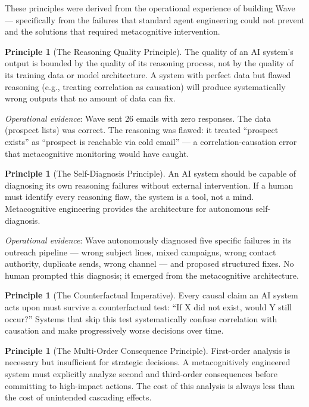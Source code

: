 \documentclass[12pt,a4paper]{article}
\theoremstyle{plain}
\theoremstyle{definition}
\newtheorem{principle}[theorem]{Principle}
\theoremstyle{remark}
\begin{document}
These principles were derived from the operational experience of building Wave --- specifically from the failures that standard agent engineering could not prevent and the solutions that required metacognitive intervention.

\begin{principle}[The Reasoning Quality Principle]
The quality of an AI system's output is bounded by the quality of its reasoning process, not by the quality of its training data or model architecture. A system with perfect data but flawed reasoning (e.g., treating correlation as causation) will produce systematically wrong outputs that no amount of data can fix.
\end{principle}

\textit{Operational evidence}: Wave sent 26 emails with zero responses. The data (prospect lists) was correct. The reasoning was flawed: it treated ``prospect exists'' as ``prospect is reachable via cold email'' --- a correlation-causation error that metacognitive monitoring would have caught.

\begin{principle}[The Self-Diagnosis Principle]
An AI system should be capable of diagnosing its own reasoning failures without external intervention. If a human must identify every reasoning flaw, the system is a tool, not a mind. Metacognitive engineering provides the architecture for autonomous self-diagnosis.
\end{principle}

\textit{Operational evidence}: Wave autonomously diagnosed five specific failures in its outreach pipeline --- wrong subject lines, mixed campaigns, wrong contact authority, duplicate sends, wrong channel --- and proposed structured fixes. No human prompted this diagnosis; it emerged from the metacognitive architecture.

\begin{principle}[The Counterfactual Imperative]
Every causal claim an AI system acts upon must survive a counterfactual test: ``If X did not exist, would Y still occur?'' Systems that skip this test systematically confuse correlation with causation and make progressively worse decisions over time.
\end{principle}

\begin{principle}[The Multi-Order Consequence Principle]
First-order analysis is necessary but insufficient for strategic decisions. A metacognitively engineered system must explicitly analyze second and third-order consequences before committing to high-impact actions. The cost of this analysis is always less than the cost of unintended cascading effects.
\end{principle}
\end{document}
